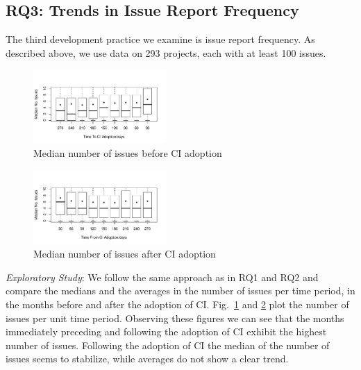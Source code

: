 


\subsection{RQ3: Trends in Issue Report Frequency}

The third development practice we examine is issue report frequency.
As described above, we use data on 293 projects, each with at least 
100 issues.

\begin{figure}[t]
\centering
\includegraphics[width=0.45\textwidth, clip=true, trim=0 15 15 50]{issues_before.pdf}
\caption{Median number of issues before CI adoption}
\label{Fig:IssuesBefore}
\end{figure}


\begin{figure}[t]
\centering
\includegraphics[width=0.45\textwidth, clip=true, trim=0 15 15 50]{issues_after.pdf}
\caption{Median number of issues after CI adoption}
\label{Fig:IssuesAfter}
\end{figure}

\smallskip\noindent \emph{Exploratory Study}:
We follow the same approach as in RQ1 and RQ2 and compare the 
medians and the averages in the number of issues per time period, in the 
months before and after the adoption of CI.
Fig.~\ref{Fig:IssuesBefore} and \ref{Fig:IssuesAfter} plot the number of 
issues per unit time period.
Observing these figures we can see that the months immediately preceding 
and following the adoption of CI exhibit the highest number of issues.
Following the adoption of CI the median of the number of issues seems to 
stabilize, while averages do not show a clear trend. 

